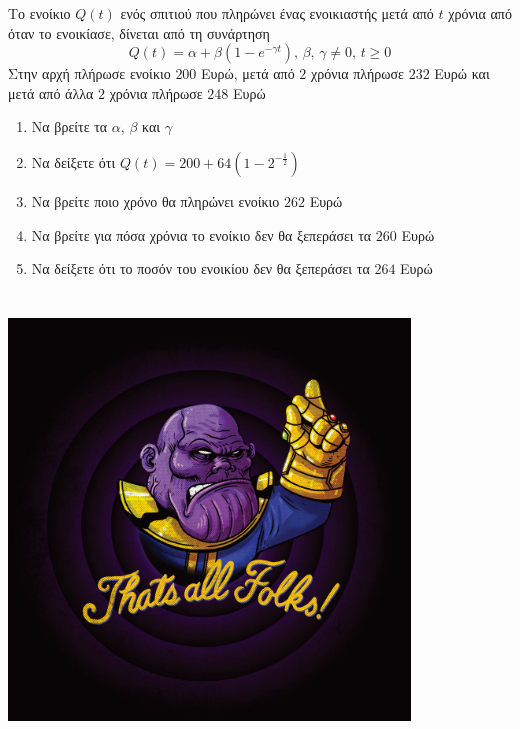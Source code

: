 \documentclass[greek]{beamer}
\begin{document}
\begin{askisi}
  Το ενοίκιο $Q(t)$ ενός σπιτιού που πληρώνει ένας ενοικιαστής μετά από $t$ χρόνια από όταν το ενοικίασε, δίνεται από τη συνάρτηση
  $$Q(t)=α+β(1-e^{-γt}) \text{, } β \text{, } γ\ne 0\text{, } t\ge 0$$
  Στην αρχή πλήρωσε ενοίκιο $200$ Ευρώ, μετά από $2$ χρόνια πλήρωσε $232$ Ευρώ και μετά από άλλα $2$ χρόνια πλήρωσε $248$ Ευρώ
  \begin{enumerate}
    \item<1-> Να βρείτε τα $α$, $β$ και $γ$
    \item<2-> Να δείξετε ότι $Q(t)=200+64\left( 1-2^{-\frac{1}{2}} \right) $
    \item<3-> Να βρείτε ποιο χρόνο θα πληρώνει ενοίκιο $262$ Ευρώ
    \item<4-> Να βρείτε για πόσα χρόνια το ενοίκιο δεν θα ξεπεράσει τα $260$ Ευρώ
    \item<5-> Να δείξετε ότι το ποσόν του ενοικίου δεν θα ξεπεράσει τα $264$ Ευρώ
  \end{enumerate}


\end{askisi}

\appendix

\section{}
\begin{frame}
  \centering
  \includegraphics[width=0.8\textwidth]{"./images/thatsall.png"}

\end{frame}
\end{document}
